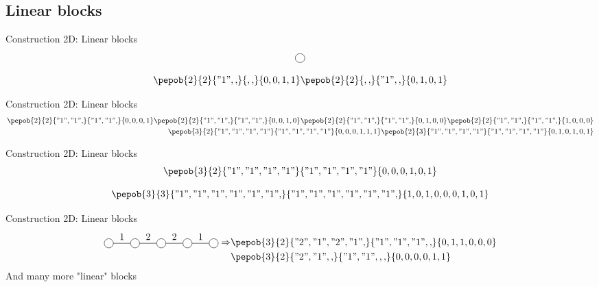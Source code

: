 \documentclass[aspectratio=169]{beamer}
\begin{document}
\subsection{ Linear blocks}


\begin{frame}{Construction 2D: Linear blocks}
    \begin{equation}
        \mpob{1}{ {,}  }{}{}{}{{,,}}
    \end{equation}

    \begin{equation}
        \pepob{2}{2}{{"1",,}}{{,,}}{{0,0,1,1}}  \pepob{2}{2}{{,,}}{{"1",,}}{{0,1,0,1}}
    \end{equation}



\end{frame}


\begin{frame}{Construction 2D: Linear blocks}
    \begin{equation}
        \begin{split}
            \pepob{2}{2}{{"1","1",}}{{"1","1",}}{{0,0,0,1}}  \pepob{2}{2}{{"1","1",}}{{"1","1",}}{{0,0,1,0}}\pepob{2}{2}{{"1","1",}}{{"1","1",}}{{0,1,0,0}} \pepob{2}{2}{{"1","1",}}{{"1","1",}}{{1,0,0,0}}\\
            \pepob{3}{2}{{"1","1","1","1"}}{{"1","1","1","1"}}{{0,0,0,1,1,1}} \pepob{2}{3}{{"1","1","1","1"}}{{"1","1","1","1"}}{{0,1,0,1,0,1}}
        \end{split}
    \end{equation}
\end{frame}

\begin{frame}{Construction 2D: Linear blocks}
    \begin{equation}
        \pepob{3}{2}{{"1","1","1","1"}}{{"1","1","1","1"}}{{0,0,0,1,0,1}}
    \end{equation}

    \begin{equation}
        \pepob{3}{3}{{"1","1","1","1","1","1",}}{{"1","1","1","1","1","1",}}{{1,0,1,0,0,0,1,0,1}}
    \end{equation}
\end{frame}

\begin{frame}{Construction 2D: Linear blocks}
    \begin{equation}
        \begin{split}
            \mpob{5}{ {,"1","2","2","1",}  }{}{}{}{{,,,,,}} \Rightarrow &\pepob{3}{2}{{"2","1","2","1",}}{{"1","1","1",,}}{{0,1,1,0,0,0}}\\
            &\pepob{3}{2}{{"2","1",,}}{{"1","1",,,}}{{0,0,0,0,1,1}}
        \end{split}
    \end{equation}
    And many more "linear" blocks
\end{frame}
\end{document}
